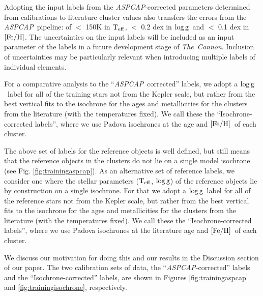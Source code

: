 \documentclass[12pt, preprint]{aastex}
\newcommand{\teff}{\mbox{$\rm T_{eff}$}}
\newcommand{\feh}{\mbox{$\rm [Fe/H]$}}
\newcommand{\logg}{\mbox{$\rm \log g$}}
\newcommand{\tc}{\textsl{The~Cannon}}
\newcommand{\aspcap}{\textsl{ASPCAP}}
\begin{document}
Adopting the input labels from the \aspcap-corrected parameters determined from calibrations to literature cluster values also transfers the errors from the \aspcap\ pipeline: of $<$ 150K in \teff,  $<$ 0.2 dex in \logg\ and $<$ 0.1 dex in \feh.   
The uncertainties on the input labels will be included as an input parameter of the labels in a future development stage of \tc. Inclusion of uncertainties may be particularly relevant when introducing multiple labels of individual elements. 

For a comparative analysis to the ``\aspcap\ corrected'' labels, we adopt a \logg\ label for all of the training stars not from the Kepler scale, but rather from the best vertical fits to the isochrone for the ages and metallicities for the clusters from the literature (with the temperatures fixed). 
We call these the ``Isochrone-corrected labels'', where we use Padova isochrones at the age and \feh\ of each cluster. 

The above set of labels for the reference objects is well defined, but still means that the reference objects in the clusters do not lie on a single model isochrone 
(see Fig. \ref{fig:trainingaspcap}). 
As an alternative set of reference labels, we consider one where the stellar parameters (\teff , \logg ) of the reference objects lie by construction on a single isochrone. 
For that we adopt a \logg\ label for all of the reference stars not from the Kepler scale, but rather from the best vertical fits to the isochrone for the ages and metallicities for the clusters from the literature (with the temperatures fixed). We call these the ``Isochrone-corrected labels'', where we use Padova isochrones at the literature age and \feh\ of each cluster. 

We discuss our motivation for doing this and our results in the Discussion section of our paper.  
The two calibration sets of data, the ``\aspcap-corrected'' labels and the ``Isochrone-corrected'' labels, are shown in Figures \ref{fig:trainingaspcap} and \ref{fig:trainingisochrone}, respectively. 
\end{document}
